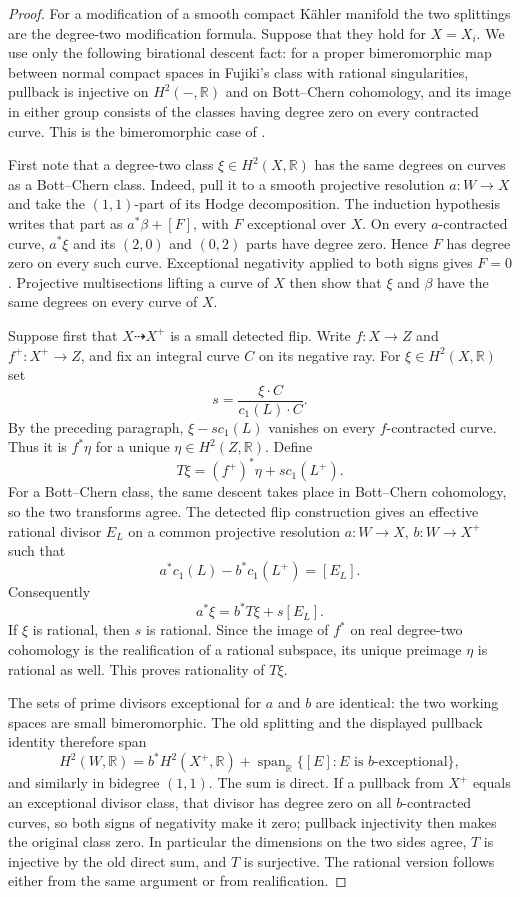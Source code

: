 \begin{proof}
For a modification of a smooth compact K\"ahler manifold the two
splittings are the degree-two modification formula. Suppose that they
hold for $X=X_i$. We use only the following birational descent fact:
for a proper bimeromorphic map between normal compact spaces in
Fujiki's class with rational singularities, pullback is injective on
$H^2(-,\mathbb R)$ and on Bott--Chern cohomology, and its image in
either group consists of the classes having degree zero on every
contracted curve. This is the bimeromorphic case of
\cite[Lemma~2.6(1)]{DH2024}.

First note that a degree-two class $\xi\in H^2(X,\mathbb R)$ has
the same degrees on curves as a Bott--Chern class. Indeed, pull it to
a smooth projective resolution $a:W\to X$ and take the $(1,1)$-part
of its Hodge decomposition. The induction hypothesis writes that
part as $a^*\beta+[F]$, with $F$ exceptional over $X$. On every
$a$-contracted curve, $a^*\xi$ and its $(2,0)$ and $(0,2)$ parts
have degree zero. Hence $F$ has degree zero on every such curve.
Exceptional negativity applied to both signs gives $F=0$.
Projective multisections lifting a curve of $X$ then show that
$\xi$ and $\beta$ have the same degrees on every curve of $X$.

Suppose first that $X\dashrightarrow X^+$ is a small detected flip.
Write $f:X\to Z$ and $f^+:X^+\to Z$, and fix an integral curve
$C$ on its negative ray. For $\xi\in H^2(X,\mathbb R)$ set
\[
                    s=\frac{\xi\cdot C}{c_1(L)\cdot C}.
\]
By the preceding paragraph, $\xi-s c_1(L)$ vanishes on every
$f$-contracted curve. Thus it is $f^*\eta$ for a unique
$\eta\in H^2(Z,\mathbb R)$. Define
\[
                    T\xi=(f^+)^*\eta+s c_1(L^+).
\]
For a Bott--Chern class, the same descent takes place in
Bott--Chern cohomology, so the two transforms agree. The detected
flip construction gives an effective rational divisor $E_L$ on a
common projective resolution $a:W\to X$, $b:W\to X^+$ such that
\[
             a^*c_1(L)-b^*c_1(L^+)=[E_L].
\]
Consequently
\[
                         a^*\xi=b^*T\xi+s[E_L].
\]
If $\xi$ is rational, then $s$ is rational. Since the image of
$f^*$ on real degree-two cohomology is the realification of a
rational subspace, its unique preimage $\eta$ is rational as well.
This proves rationality of $T\xi$.

The sets of prime divisors exceptional for $a$ and $b$ are identical:
the two working spaces are small bimeromorphic. The old splitting
and the displayed pullback identity therefore span
\[
              H^2(W,\mathbb R)
                =b^*H^2(X^+,\mathbb R)
                   +\operatorname{span}_{\mathbb R}\{[E]:E\text{ is }b
                   \text{-exceptional}\},
\]
and similarly in bidegree $(1,1)$. The sum is direct. If a pullback
from $X^+$ equals an exceptional divisor class, that divisor has
degree zero on all $b$-contracted curves, so both signs of negativity
make it zero; pullback injectivity then makes the original class
zero. In particular the dimensions on the two sides agree, $T$ is
injective by the old direct sum, and $T$ is surjective. The rational
version follows either from the same argument or from realification.


\end{proof}
